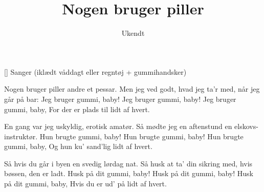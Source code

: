 \documentclass[a4paper,11pt]{article}
\title{Nogen bruger piller}
\author{Ukendt}
\begin{document}
\maketitle

\begin{roles}
    [] Sanger (iklædt våddagt eller regntøj + gummihandsker) 
\end{roles}

\begin{song}
   Nogen bruger piller
            andre et pessar.
            Men jeg ved godt, hvad jeg ta'r med,
            når jeg går på bar:
                Jeg bruger gummi, baby!
                Jeg bruger gummi, baby!
                Jeg bruger gummi, baby,
            For der er plads til lidt af hvert.

            En gang var jeg uskyldig,
            erotisk amatør.
            Så mødte jeg en aftenstund
            en elskovs-instruktør.
                Hun brugte gummi, baby!
                Hun brugte gummi, baby!
                Hun brugte gummi, baby,
            Og hun ku' sand'lig lidt af hvert.

            Så hvis du går i byen
            en svedig lørdag nat.
            Så husk at ta' din sikring med,
            hvis bøssen, den er ladt.
                Husk på dit gummi, baby!
                Husk på dit gummi, baby!
                Husk på dit gummi, baby,
            Hvis du er ud' på lidt af hvert.
\end{song}
\end{document}
